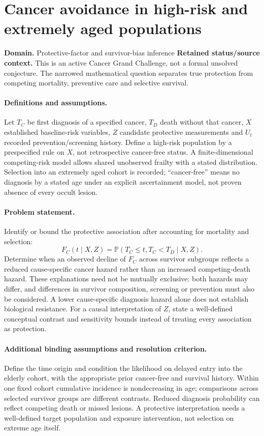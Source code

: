 \documentclass[11pt]{article}
\begin{document}
\section*{Cancer avoidance in high-risk and extremely aged populations}
\label{prob:241}
\label{rank:11}
\par\smallskip

\noindent\textbf{Domain.} Protective-factor and survivor-bias inference \quad \textbf{Retained status/source context.} This is an active Cancer Grand Challenge, not a formal unsolved conjecture. The narrowed mathematical question separates true protection from competing mortality, preventive care and selective survival.
\paragraph{Definitions and assumptions.} Let $T_C$ be first diagnosis of a specified cancer, $T_D$ death without that cancer, $X$ established baseline-risk variables, $Z$ candidate protective measurements and $U_t$ recorded prevention/screening history. Define a high-risk population by a prespecified rule on $X$, not retrospective cancer-free status. A finite-dimensional competing-risk model allows shared unobserved frailty with a stated distribution. Selection into an extremely aged cohort is recorded; ``cancer-free'' means no diagnosis by a stated age under an explicit ascertainment model, not proven absence of every occult lesion.
\paragraph{Problem statement.} Identify or bound the protective association after accounting for mortality and selection:
    \[F_C(t\mid X,Z)=\mathbb{P}(T_C\leq t,T_C<T_D\mid X,Z).\]
    Determine when an observed decline of $F_C$ across survivor subgroups reflects a reduced cause-specific cancer hazard rather than an increased competing-death hazard. These explanations need not be mutually exclusive: both hazards may differ, and differences in survivor composition, screening or prevention must also be considered. A lower cause-specific diagnosis hazard alone does not establish biological resistance. For a causal interpretation of $Z$, state a well-defined conceptual contrast and sensitivity bounds instead of treating every association as protection.
\paragraph{Additional binding assumptions and resolution criterion.} Define the time origin and condition the likelihood on delayed entry into the elderly cohort, with the appropriate prior cancer-free and survival history. Within one fixed cohort cumulative incidence is nondecreasing in age; comparisons across selected survivor groups are different contrasts. Reduced diagnosis probability can reflect competing death or missed lesions. A protective interpretation needs a well-defined target population and exposure intervention, not selection on extreme age itself.
\end{document}
